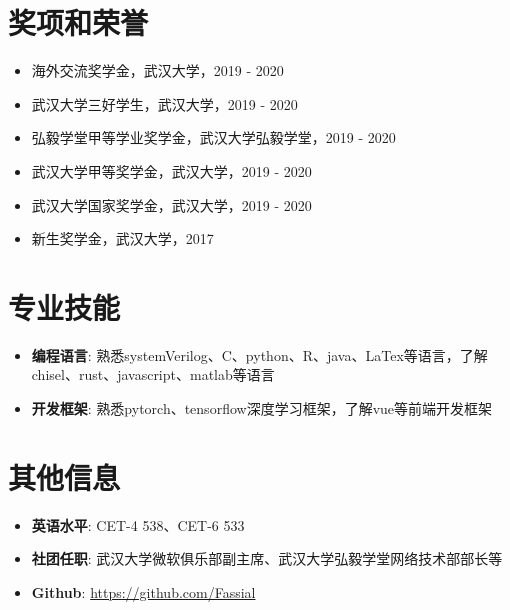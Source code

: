 \documentclass{resume}
\begin{document}
\section{{\bfseries 奖项和荣誉}}
\begin{itemize}[parsep=0.2ex]
    \item 海外交流奖学金，武汉大学，2019 - 2020
    \item 武汉大学三好学生，武汉大学，2019 - 2020
    \item 弘毅学堂甲等学业奖学金，武汉大学弘毅学堂，2019 - 2020
    \item 武汉大学甲等奖学金，武汉大学，2019 - 2020
    \item 武汉大学国家奖学金，武汉大学，2019 - 2020
    \item 新生奖学金，武汉大学，2017
\end{itemize}

\section{{\bfseries 专业技能}}
\begin{itemize}[parsep=0.2ex]
    \item \textbf{编程语言}: 熟悉systemVerilog、C、python、R、java、LaTex等语言，了解chisel、rust、javascript、matlab等语言
    \item \textbf{开发框架}: 熟悉pytorch、tensorflow深度学习框架，了解vue等前端开发框架
\end{itemize}

\section{{\bfseries 其他信息}}
\begin{itemize}[parsep=0.2ex]
    \item \textbf{英语水平}: CET-4 538、CET-6 533
    \item \textbf{社团任职}: 武汉大学微软俱乐部副主席、武汉大学弘毅学堂网络技术部部长等
    \item \textbf{Github}: \href{https://github.com/Fassial}{https://github.com/Fassial}
\end{itemize}
\end{document}
